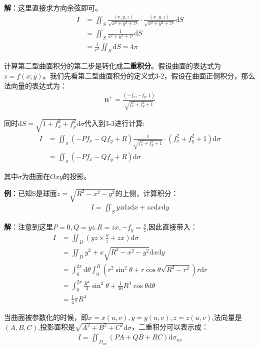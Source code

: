 \documentclass{ctexart}
\let\oldtextbf\textbf
\renewcommand{\textbf}[1]{\textcolor{brown!50!red}{\oldtextbf{#1}}}
\begin{document}
\textbf{\color{brown!50!red}解}：这里直接求方向余弦即可。
\begin{align*}
I&=\iint_S\frac{(x,y,z)}{\sqrt{x^2+y^2+z^2}}\cdot \frac{(x,y,z)}{\sqrt{x^2+y^2+z^2}}  \mathrm{d}S 
\\&=\iint_S\frac{1}{x^2+y^2+z^2}\mathrm{d}S\\
&=\frac{1}{r^2}\iint_S\mathrm{d}S=4\pi   
\end{align*}


计算第二型曲面积分的第二步是转化成\textbf{\color{brown!50!red}二重积分}。假设曲面的表达式为$z=f(x;y)$。我们先看第二型曲面积分的定义式3-2，假设在曲面正侧积分，那么法向量的表达式为：
\begin{align*}
\bm{n}^+ =\frac{(-f_x,-f_y,1)}{\sqrt{f_x^2+f_y^2+1}}  
\end{align*}

同时$\mathrm{d}S=\sqrt{1+f_x^2+f_y^2}\mathrm{d}\sigma$代入到3-3进行计算:
\begin{align*}
I&=\iint_\sigma (-Pf_x-Qf_y+R )\frac{1}{\sqrt{f_x^2+f_y^2+1} } \cdot(f_x^2+f_y^2+1)\mathrm{d}\sigma\\
&= \iint_\sigma (-Pf_x-Qf_y+R )\mathrm{d}\sigma\tag{3-5} 
\end{align*}

其中$\sigma$为曲面在$Oxy$的投影。

\textbf{\color{brown!50!red}例}：已知S是球面$z=\sqrt{R^2-x^2-y^2}$的上侧，计算积分：
\begin{align*}
    I=\iint_S yz\mathrm{d}z\mathrm{d}x+zx\mathrm{d}x\mathrm{d}y
\end{align*}

\textbf{\color{brown!50!red}解}：注意到这里$P=0,Q=yz.R=zx,-f_y=\frac{y}{z}$,因此直接带入：
\begin{align*}
 I&=\iint_D (yz\times\frac{y}{z}+zx)\mathrm{d}\sigma \\
&=\iint_D  y^2+x\sqrt{R^2-x^2-y^2}\mathrm{d}x\mathrm{d}y\\
&= \int_0^{2\pi}\mathrm{d}\theta\int_0^R(r^2\sin^2\theta+r\cos\theta\sqrt{R^2-r^2})r\mathrm{d}r
\\&=\int_0^{2\pi}\frac{R^4}{4}\sin^2\theta+\frac{1}{16}R^4\cos\theta\mathrm{d}\theta\\ 
&=\frac{1}{4} \pi R^4
\end{align*}

当曲面被参数化的时候，即$x=x(u,v),y=y(u,v),z=z(u,v)$,法向量是$(A,B,C)$,投影面积是$\sqrt{A^2+B^2+C^2}\mathrm{d}\sigma$，二重积分可以表示成：
\begin{align*}
I=\iint_{D_{uv}}(PA+QB+RC)\mathrm{d}\sigma_{uv}\tag{3-6}
\end{align*}
\end{document}

